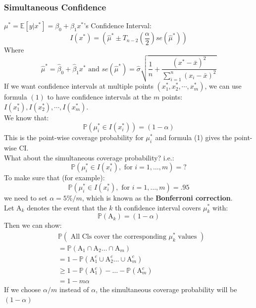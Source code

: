 \documentclass[11pt,a4paper]{article}
\begin{document}
\subsubsection{Simultaneous Conﬁdence}
$\mu^*=\mathbb{E}[y|x^*]=\beta_0+\beta_1x^*$'s Confidence Interval:
$$I(x^*)=(\hat{\mu}^*\pm T_{n-2}(\frac{\alpha}{2})se(\hat{\mu}^*))$$
Where $$\hat{\mu}^*=\hat{\beta}_0+\hat{\beta}_1x^*\text{ and }se(\hat{\mu}^*)=\hat{\sigma}\sqrt{\frac{1}{n}+\frac{(x^*-\bar{x})^2}{\sum_{i=1}^n(x_i-\bar{x})^2}}$$
If we want conﬁdence intervals at multiple points $(x_1^*, x_2^*, \cdots, x_m^*)$, we can use formula $(1)$ to have conﬁdence intervals at the $m$ points: $I(x_1^*), I(x_2^*), \cdots, I(x_m^*)$.\\
We know that:
$$
\mathbb{P}\left(\mu_{i}^{*} \in I\left(x_{i}^{*}\right)\right)=(1-\alpha)
$$
This is the point-wise coverage probability for $\mu_{i}^{*}$ and formula (1) gives the point-wise CI.\\
What about the simultaneous coverage probability? i.e.:
$$
\mathbb{P}\left(\mu_{i}^{*} \in I\left(x_{i}^{*}\right), \text { for } i=1, \ldots, m\right)=?
$$
To make sure that (for example):
$$
\mathbb{P}\left(\mu_{i}^{*} \in I\left(x_{i}^{*}\right), \text { for } i=1, \ldots, m\right)=.95
$$
we need to set $\alpha=5 \% / m$, which is known as the \textbf{Bonferroni correction}.\\
Let $\mathrm{A}_{k}$ denotes the event that the $k$ th confidence interval covers $\mu_{k}^{*}$ with:
$$
\mathbb{P}\left(\mathrm{A}_{k}\right)=(1-\alpha)
$$
Then we can show:
$$
\begin{aligned}
&\mathbb{P}\left(\text { All Cls cover the corresponding } \mu_{k}^{*} \text { values }\right) \\
&=\mathbb{P}\left(\mathrm{A}_{1} \cap \mathrm{A}_{2} \ldots \cap \mathrm{A}_{m}\right) \\
&=1-\mathbb{P}\left(\mathrm{A}_{1}^{c} \cup \mathrm{A}_{2}^{c} \ldots \cup \mathrm{A}_{m}^{c}\right) \\
&\geq 1-\mathbb{P}\left(\mathrm{A}_{1}^{c}\right)-\ldots-\mathbb{P}\left(\mathrm{A}_{m}^{c}\right) \\
&=1-m \alpha
\end{aligned}
$$
If we choose $\alpha / m$ instead of $\alpha$, the simultaneous coverage probability will be $(1-\alpha)$
\end{document}
